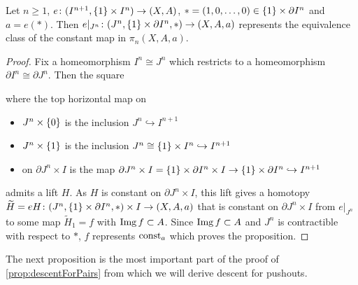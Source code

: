 \begin{lemma}\label{lem:compressionVariation}
    Let $n\geq 1$, $e\colon(I^{n+1},\left\lbrace1\right\rbrace\times I^n)\to (X,A)$, $*=(1,0,\ldots,0)\in\left\lbrace1\right\rbrace\times\partial I^n$ and $a=e(*)$. 
    Then $e|_{J^n}\colon(J^n,\left\lbrace1\right\rbrace\times\partial I^n,*)\to(X,A,a)$ represents the equivalence class of the constant map in $\pi_n(X,A,a)$.
    \begin{proof}
        Fix a homeomorphism $I^n\cong J^n$ which restricts to a homeomorphism $\partial I^n\cong \partial J^n$.
        Then the square  
        \begin{center}
        \end{center}
        where the top horizontal map on
        \begin{itemize}
            \item $J^n\times\left\lbrace0\right\rbrace$ is the inclusion $J^n\hookrightarrow I^{n+1}$
            \item $J^n\times\left\lbrace1\right\rbrace$ is the inclusion $J^n\cong\left\lbrace1\right\rbrace\times I^n\hookrightarrow I^{n+1}$
            \item on $\partial J^n \times I$ is the map $\partial J^n \times I=\left\lbrace1\right\rbrace\times\partial I^n\times I\to\left\lbrace1\right\rbrace\times\partial I^n \hookrightarrow I^{n+1}$
        \end{itemize}
        admits a lift $H$. 
        As $H$ is constant on $\partial J^n\times I$, this lift gives a homotopy $\widetilde{H}=eH\colon(J^n,\left\lbrace1\right\rbrace\times \partial I^n,*)\times I\to (X,A,a)$  that is constant on $\partial J^n\times I$ from $e|_{J^n}$ to some map $\widetilde{H}_1=f$ with $\operatorname{Img} f\subset A$.
        Since $\operatorname{Img} f\subset A$ and $J^n$ is contractible with respect to $*$, $f$ represents $\operatorname{const}_a$ which proves the proposition. 
    \end{proof}
\end{lemma}
The next proposition is the most important part of the proof of \cref{prop:descentForPairs} from which we will derive descent for pushouts.
